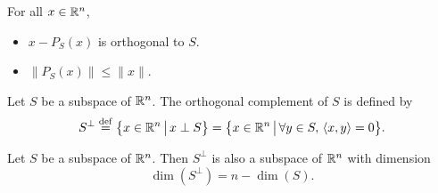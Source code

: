 \documentclass[11pt,nocut]{article}
\begin{document}
\begin{corollary}\label{cor:projection}
	For all $x \in \mathbb{R}^n$,
	\begin{itemize}
		\item $x - P_S(x)$ is orthogonal to $S$.
		\item $\|P_S(x) \| \leq \|x\|$.
	\end{itemize}
\end{corollary}


\begin{definition}
	Let $S$ be a subspace of $\mathbb{R}^n$. The orthogonal complement of $S$ is defined by
	$$
	S^{\perp} \overset{\rm def}{=} 
	\big\{ x \in \mathbb{R}^n \, \big| \, x \perp S \big\} = 
	\big\{ x \in \mathbb{R}^n \, \big| \, \forall y \in S, \, \langle x,y \rangle = 0 \big\}.
	$$
\end{definition}

\begin{proposition}
	Let $S$ be a subspace of $\mathbb{R}^n$. Then $S^{\perp}$ is also a subspace of $\mathbb{R}^n$ with dimension
	$$
	\dim(S^{\perp}) = n - \dim(S).
	$$
\end{proposition}

\vspace{1cm}
\centerline{}

%
%
\end{document}
